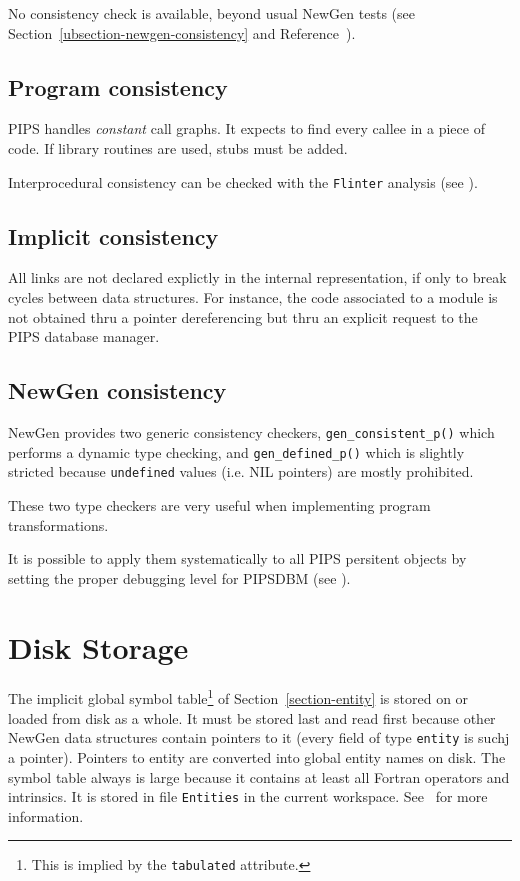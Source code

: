 \documentclass[a4paper]{article}
\begin{document}
No consistency check is available, beyond usual NewGen tests (see
Section~\ref{ubsection-newgen-consistency} and Reference~\cite{JT90}).

\subsection{Program consistency}

PIPS handles \emph{constant} call graphs. It expects to find every callee
in a piece of code. If library routines are used, stubs must be added.

Interprocedural consistency can be checked with the \texttt{Flinter}
analysis (see \cite{TrIr91}).

\subsection{Implicit consistency}

All links are not declared explictly in the internal representation, if
only to break cycles between data structures. For instance, the code
associated to a module is not obtained thru a pointer dereferencing but
thru an explicit request to the PIPS database manager.

\subsection{NewGen consistency}
\label{subsection-newgen-consistency}

NewGen provides two generic consistency checkers,
\verb/gen_consistent_p()/ which performs a dynamic type checking, and
\verb/gen_defined_p()/ which is slightly stricted because
\verb/undefined/ values (i.e. NIL pointers) are mostly prohibited.

These two type checkers are very useful when implementing program transformations.

It is possible to apply them systematically to all PIPS persitent
objects by setting the proper debugging level for PIPSDBM (see
\cite{ZhIr91}).

\section{Disk Storage}

The implicit global symbol table\footnote{This is implied by the 
\texttt{tabulated} attribute.} of Section~\ref{section-entity} is stored on or
loaded from disk as a whole. It must be stored last and read first
because other NewGen data structures contain pointers to it (every field
of type \verb/entity/ is suchj a pointer). Pointers to entity are
converted into global entity names on disk. The symbol table always is
large because it contains at least all Fortran operators and
intrinsics. It is stored in file \verb/Entities/ in the current
workspace. See~\cite{Trio90} for more information.
\end{document}
